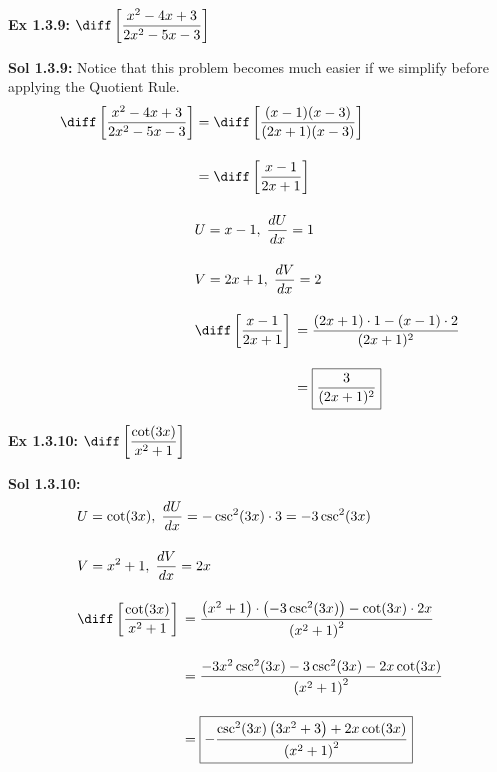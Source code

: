 \begin{tcolorbox}[example]
    \textbf{Ex 1.3.9: } $\diff \left[\dfrac{x^2 - 4x + 3}{2x^2 - 5x - 3}\right]$ 
\end{tcolorbox}
\begin{tcolorbox}[solution]
    \textbf{Sol 1.3.9: } Notice that this problem becomes much easier if we simplify before applying the Quotient Rule. \begin{align*}
        \diff \left[\dfrac{x^2 - 4x + 3}{2x^2 - 5x - 3}\right] & = \diff \left[\dfrac{(x - 1)(x - 3)}{(2x + 1)(x - 3)}\right] \\[11pt] 
        & = \diff \left[\dfrac{x - 1}{2x + 1}\right] \\[11pt]
        & U = x - 1, \; \dfrac{dU}{dx} = 1 \\[11pt]
        & V = 2x + 1, \; \dfrac{dV}{dx} = 2 \\[11pt]
        & \diff \left[\dfrac{x - 1}{2x + 1}\right] \begin{aligned}[t]
            & = \dfrac{(2x + 1) \cdot 1 - (x - 1) \cdot 2}{(2x + 1)^2} \\[11pt]
            & = \boxed{\dfrac{3}{(2x + 1)^2}}
        \end{aligned}
    \end{align*}
\end{tcolorbox} \vspace{11pt}

\begin{tcolorbox}[example]
    \textbf{Ex 1.3.10: } $\diff \left[\dfrac{\cot (3x)}{x^2 + 1}\right]$ 
\end{tcolorbox}
\begin{tcolorbox}[solution]
    \textbf{Sol 1.3.10: } \begin{align*}
        & U = \cot (3x), \; \dfrac{dU}{dx} = -\csc^2 (3x) \cdot 3 = -3\csc^2 (3x)\\[11pt]
        & V = x^2 + 1, \; \dfrac{dV}{dx} = 2x \\[11pt]
        & \diff \left[\dfrac{\cot (3x)}{x^2 + 1}\right] \begin{aligned}[t]
            & = \dfrac{\left(x^2 + 1\right) \cdot \left(-3\csc^2 (3x)\right) - \cot (3x) \cdot 2x}{\left(x^2 + 1\right)^2} \\[11pt]
            & = \dfrac{-3x^2\csc^2 (3x) - 3\csc^2 (3x) - 2x\cot (3x)}{\left(x^2 + 1\right)^2} \\[11pt]
            & = \boxed{-\dfrac{\csc^{2}(3x)\left(3x^2 + 3\right) + 2x \cot(3x)}{\left(x^2 + 1\right)^2}}
        \end{aligned}
    \end{align*}
\end{tcolorbox} 

